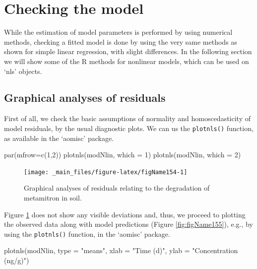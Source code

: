 \documentclass[a4paper,12pt,oneside]{book}
\newenvironment{Shaded}{\begin{snugshade}}{\end{snugshade}}
\newcommand{\DecValTok}[1]{#1}
\newcommand{\StringTok}[1]{#1}
\newcommand{\FunctionTok}[1]{#1}
\newcommand{\AttributeTok}[1]{#1}
\newcommand{\NormalTok}[1]{#1}
\begin{document}
\hypertarget{checking-the-model}{%
\section{Checking the model}\label{checking-the-model}}

While the estimation of model parameters is performed by using numerical methods, checking a fitted model is done by using the very same methods as shown for simple linear regression, with slight differences. In the following section we will show some of the R methods for nonlinear models, which can be used on `nls' objects.

\hypertarget{graphical-analyses-of-residuals}{%
\subsection{Graphical analyses of residuals}\label{graphical-analyses-of-residuals}}

First of all, we check the basic assumptions of normality and homoscedasticity of model residuals, by the usual diagnostic plots. We can us the \texttt{plotnls()} function, as available in the `aomisc' package.

\begin{Shaded}
\begin{Highlighting}[]
\FunctionTok{par}\NormalTok{(}\AttributeTok{mfrow=}\FunctionTok{c}\NormalTok{(}\DecValTok{1}\NormalTok{,}\DecValTok{2}\NormalTok{))}
\FunctionTok{plotnls}\NormalTok{(modNlin, }\AttributeTok{which =} \DecValTok{1}\NormalTok{)}
\FunctionTok{plotnls}\NormalTok{(modNlin, }\AttributeTok{which =} \DecValTok{2}\NormalTok{)}
\end{Highlighting}
\end{Shaded}

\begin{figure}

{\centering \texttt{[image: \_main\_files/figure-latex/figName154-1]} 

}

\caption{Graphical analyses of residuals relating to the degradation of metamitron in soil.}\label{fig:figName154}
\end{figure}

Figure \ref{fig:figName154} does not show any visible deviations and, thus, we proceed to plotting the observed data along with model predictions (Figure \ref{fig:figName155}), e.g., by using the \texttt{plotnls()} function, in the `aomisc' package.

\begin{Shaded}
\begin{Highlighting}[]
\FunctionTok{plotnls}\NormalTok{(modNlin, }\AttributeTok{type =} \StringTok{"means"}\NormalTok{,}
        \AttributeTok{xlab =} \StringTok{"Time (d)"}\NormalTok{, }\AttributeTok{ylab =} \StringTok{"Concentration (ng/g)"}\NormalTok{)}
\end{Highlighting}
\end{Shaded}
\end{document}
